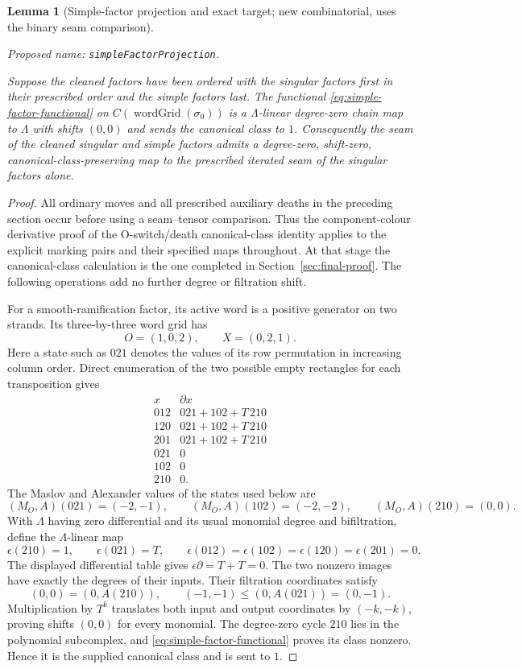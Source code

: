 \documentclass[11pt,a4paper]{article}
\newtheorem{lemma}[theorem]{Lemma}
\theoremstyle{remark}
\newcommand{\formalname}[1]{\leavevmode\par\noindent\textnormal{\small Proposed name: \texttt{#1}.}\par\smallskip}
\begin{document}
\begin{lemma}[Simple-factor projection and exact target;
new combinatorial, uses the binary seam comparison]
\label{lem:simple-factor}
\formalname{simpleFactorProjection}
Suppose the cleaned factors have been ordered with the singular
factors first in their prescribed order and the simple factors last.
The functional \eqref{eq:simple-factor-functional} on
$C(\operatorname{wordGrid}(\sigma_0))$ is a $\Lambda$-linear
degree-zero chain map to $\Lambda$ with shifts $(0,0)$ and sends
the canonical class to $1$.  Consequently the seam of the cleaned
singular and simple factors admits a degree-zero, shift-zero,
canonical-class-preserving map to the prescribed iterated seam
of the singular factors alone.
\end{lemma}
\begin{proof}

All ordinary moves and all prescribed auxiliary deaths in the preceding
section occur before using a seam--tensor comparison.  Thus the
component-colour derivative proof of the O-switch/death canonical-class
identity applies to the explicit marking pairs and their specified maps
throughout.  At that stage the canonical-class
calculation is the one completed in Section~\ref{sec:final-proof}.
The following operations add no further degree or filtration shift.

For a smooth-ramification factor, its active word is a positive
generator on two strands.  Its three-by-three word grid has
\[
 O=(1,0,2),\qquad X=(0,2,1).
\]
Here a state such as $021$ denotes the values of its row permutation
in increasing column order.  Direct enumeration of the two possible
empty rectangles for each transposition gives
\[
\begin{array}{c|c}
 x&\partial x\\\hline
 012&021+102+T\,210\\
 120&021+102+T\,210\\
 201&021+102+T\,210\\
 021&0\\
 102&0\\
 210&0.
\end{array}
\]
The Maslov and Alexander values of the states used below are
\[
 (M_O,A)(021)=(-2,-1),\qquad
 (M_O,A)(102)=(-2,-2),\qquad
 (M_O,A)(210)=(0,0).
\]
With $\Lambda$ having zero differential and its usual monomial degree
and bifiltration, define the $\Lambda$-linear map
\begin{equation}\label{eq:simple-factor-functional}
 \epsilon(210)=1,\qquad \epsilon(021)=T,\qquad
 \epsilon(012)=\epsilon(102)=\epsilon(120)=\epsilon(201)=0.
\end{equation}
The displayed differential table gives $\epsilon\partial=T+T=0$.
The two nonzero images have exactly the degrees of their inputs.
Their filtration coordinates satisfy
\[
 (0,0)=(0,A(210)),\qquad (-1,-1)\leq(0,A(021))=(0,-1).
\]
Multiplication by $T^k$ translates both input and output coordinates
by $(-k,-k)$, proving shifts $(0,0)$ for every monomial.  The degree-zero
cycle $210$ lies in the polynomial subcomplex, and
\eqref{eq:simple-factor-functional} proves its class nonzero.  Hence
it is the supplied canonical class and is sent to $1$.


\end{proof}
\end{document}
